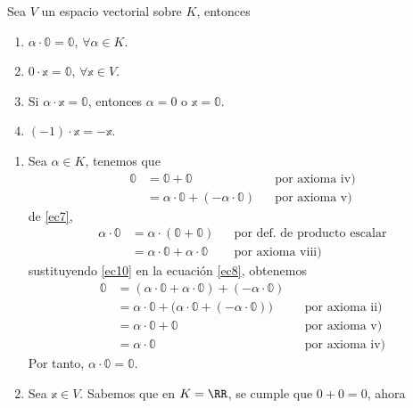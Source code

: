 \begin{theorem}{}{}
    Sea $V$ un espacio vectorial sobre $K$, entonces
    \begin{enumerate}[label=\roman*., topsep=6pt, itemsep=0pt]
        \item $\alpha \cdot \mathbb{0} = \mathbb{0}$, $\forall \alpha \in K$.
        \item $0 \cdot \mathbb{x} = \mathbb{0}$, $\forall \mathbb{x} \in V$.
        \item Si $\alpha \cdot \mathbb{x} = \mathbb{0}$, entonces $\alpha = 0$ o $\mathbb{x} = \mathbb{0}$.
        \item $(-1) \cdot \mathbb{x} = - \mathbb{x}$.
    \end{enumerate}

    \tcblower
    \demostracion
    \begin{enumerate}[label=\roman*., topsep=6pt, itemsep=0pt]
        \item Sea $\alpha \in K$, tenemos que
        \begin{align}
            \mathbb{0} & = \mathbb{0} + \mathbb{0} && \text{por axioma iv)} \label{ec7} \\
            & = \alpha \cdot \mathbb{0} + (-\alpha \cdot \mathbb{0}) && \text{por axioma v)} \label{ec8}
        \end{align}
        de \eqref{ec7},
        \begin{align}
            \alpha \cdot \mathbb{0} & = \alpha \cdot (\mathbb{0} + \mathbb{0}) && \text{por def. de producto escalar} \label{ec9} \\
            & = \alpha \cdot \mathbb{0} + \alpha \cdot \mathbb{0} && \text{por axioma viii)} \label{ec10}
        \end{align}
        sustituyendo \eqref{ec10} en la ecuación \eqref{ec8}, obtenemos
        \begin{align*}
            \mathbb{0} & = (\alpha \cdot \mathbb{0} + \alpha \cdot \mathbb{0}) + (-\alpha \cdot \mathbb{0}) \\
            & = \alpha \cdot \mathbb{0} + \big( \alpha \cdot \mathbb{0} + (-\alpha \cdot \mathbb{0}) \big) && \text{por axioma ii)} \\
            & = \alpha \cdot \mathbb{0} + \mathbb{0} && \text{por axioma v)} \\
            & = \alpha \cdot \mathbb{0} && \text{por axioma iv)}
        \end{align*}
        Por tanto, $\alpha \cdot \mathbb{0} = \mathbb{0}$.
        \item Sea $\mathbb{x} \in V$. Sabemos que en $K = \RR$, se cumple que $0 + 0 = 0$, ahora

\end{enumerate}
\end{theorem}
